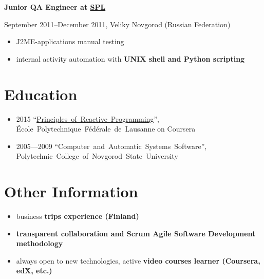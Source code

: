 \vspace{0.5cm}

{
\fontsize{12pt}{12pt}\selectfont
\bfseries Junior QA Engineer at
\href{http://spl.co}{\bfseries SPL\mdseries}
\mdseries
}

{
\fontsize{9pt}{8pt}\selectfont
September 2011--December 2011, Veliky Novgorod (Russian Federation)
}

\begin{itemize}[rightmargin=\dimexpr\linewidth-17cm-\leftmargin\relax]
    \setlength{\itemindent}{20pt}
    \item J2ME-applications manual testing
    \item internal activity automation with
\bfseries UNIX shell \mdseries and \bfseries Python \mdseries scripting
\end{itemize}

\section*{Education}
\begin{itemize}
    \item 2015 ``\href{https://www.coursera.org/account/accomplishments/verify/UJJ99REEZY}{Principles~of~Reactive~Programming}'', École~Polytechnique~Fédérale~de~Lausanne on Coursera
    \item 2005---2009 ``Computer~and~Automatic~Systems~Software'', Polytechnic~College~of~Novgorod~State~University
\end{itemize}

\section*{Other Information}
\begin{itemize}
\item business \bfseries trips experience \mdseries (Finland)
\item \bfseries transparent \mdseries collaboration and \bfseries Scrum \mdseries Agile Software Development methodology
\item always open to new technologies, active \bfseries video courses \mdseries learner (Coursera, edX, etc.)
\end{itemize}

